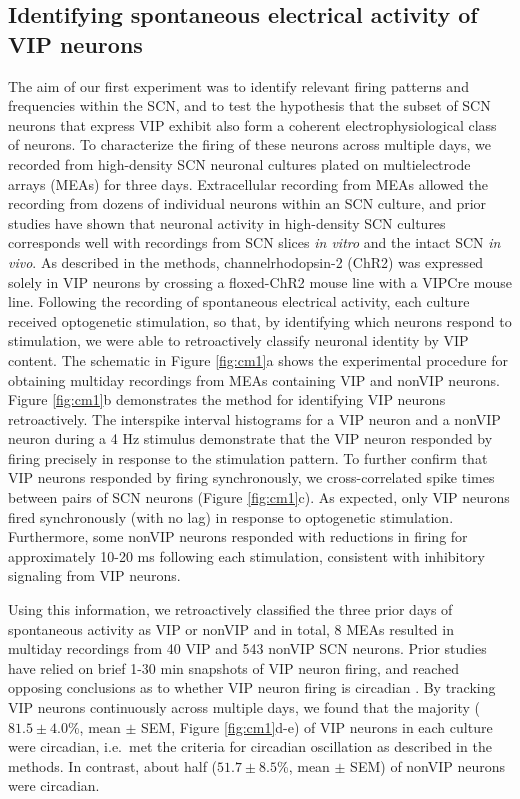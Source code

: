 \subsection*{Identifying spontaneous electrical activity of VIP neurons}
The aim of our first experiment was to identify relevant firing patterns and frequencies within the SCN, and to test the hypothesis that the subset of SCN neurons that express VIP exhibit also form a coherent electrophysiological class of neurons.
To characterize the firing of these neurons across multiple days, we recorded from high-density SCN neuronal cultures plated on multielectrode arrays (MEAs) for three days.
Extracellular recording from MEAs allowed the recording from dozens of individual neurons within an SCN culture, and prior studies have shown that neuronal activity in high-density SCN cultures corresponds well with recordings from SCN slices \textit{in vitro} and the intact SCN \textit{in vivo}.
As described in the methods, channelrhodopsin-2 (ChR2) was expressed solely in VIP neurons by crossing a floxed-ChR2 mouse line with a VIPCre mouse line.
Following the recording of spontaneous electrical activity, each culture received optogenetic stimulation, so that, by identifying which neurons respond to stimulation, we were able to retroactively classify neuronal identity by VIP content.
The schematic in Figure \ref{fig:cm1}a shows the experimental procedure for obtaining multiday recordings from MEAs containing VIP and nonVIP neurons.
Figure \ref{fig:cm1}b demonstrates the method for identifying VIP neurons retroactively.
The interspike interval histograms for a VIP neuron and a nonVIP neuron during a 4 Hz stimulus demonstrate that the VIP neuron responded by firing precisely in response to the stimulation pattern.
To further confirm that VIP neurons responded by firing synchronously, we cross-correlated spike times between pairs of SCN neurons (Figure \ref{fig:cm1}c).
As expected, only VIP neurons fired synchronously (with no lag) in response to optogenetic stimulation.
Furthermore, some nonVIP neurons responded with reductions in firing for approximately 10-20 ms following each stimulation, consistent with inhibitory signaling from VIP neurons.

Using this information, we retroactively classified the three prior days of spontaneous activity as VIP or nonVIP and in total, 8 MEAs resulted in multiday recordings from 40 VIP and 543 nonVIP SCN neurons.
Prior studies have relied on brief 1-30 min snapshots of VIP neuron firing, and reached opposing conclusions as to whether VIP neuron firing is circadian \cite{Fan2015, Hermanstyne2016}.
By tracking VIP neurons continuously across multiple days, we found that the majority ($81.5\pm4.0$\%, mean $\pm$ SEM, Figure \ref{fig:cm1}d-e) of VIP neurons in each culture were circadian, i.e.\ met the criteria for circadian oscillation as described in the methods.
In contrast, about half ($51.7\pm8.5$\%, mean $\pm$ SEM) of nonVIP neurons were circadian.

